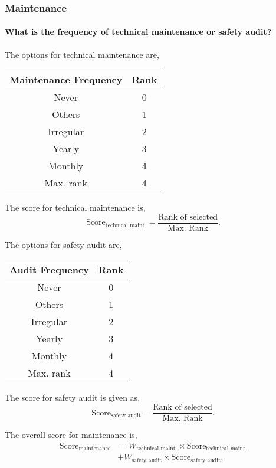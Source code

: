 \documentclass[oneside,twocolumn]{article}
\newcommand{\tsub}[2]{\text{#1}_{\text{#2}}}
\newcommand{\tsubb}[2]{#1_{\text{#2}}}
\newcommand{\dsub}[2]{\dfrac{\text{#1}}{\text{#2}}}
\newenvironment{ttable}
{
\begin{center}
\begin{tabular}{c|c}
\hline
}
{
\\ \hline
\end{tabular}
\end{center}
}
\begin{document}
\subsubsection{Maintenance}
\paragraph{What is the frequency of technical maintenance or safety audit?}
The options for technical maintenance are,
\begin{ttable}
	Maintenance Frequency & Rank \\ \hline
	Never & 0 \\
	Others & 1 \\
	Irregular & 2 \\
	Yearly & 3 \\
	Monthly & 4 \\ \hline
	Max. rank & 4 
\end{ttable}
The score for technical maintenance is,
\[
	\tsub{Score}{technical maint.} = \dsub{Rank of selected}{Max. Rank}.
\]

The options for safety audit are,
\begin{ttable}
	Audit Frequency & Rank \\ \hline
	Never & 0 \\
	Others & 1 \\
	Irregular & 2 \\
	Yearly & 3 \\
	Monthly & 4 \\ \hline
	Max. rank & 4 
\end{ttable}
The score for safety audit is given as,
\[
	\tsub{Score}{safety audit} = \dsub{Rank of selected}{Max. Rank}.
\]

The overall score for maintenance is,
\begin{align*}
	\tsub{Score}{maintenance} &= \tsubb{W}{technical maint.} \times \tsub{Score}{technical maint.} \\
	&+ \tsubb{W}{safety audit} \times \tsub{Score}{safety audit}.
\end{align*}
\end{document}
